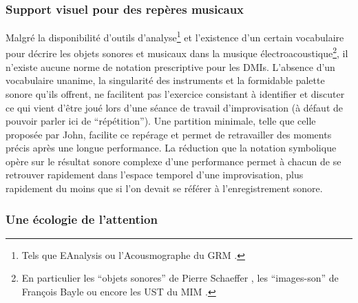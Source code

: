 \subsubsection{Support visuel pour des repères musicaux}

\noindent Malgré la disponibilité d'outils d'analyse\footnote{Tels que EAnalysis \cite{couprie_eanalysis:_2016} ou l'Acousmographe du \gls{GRM} \cite{favreau_lacousmographe_2010}.} et l'existence d'un certain vocabulaire pour décrire les objets sonores et musicaux dans la musique électroacoustique\footnote{En particulier les ``objets sonores'' de Pierre Schaeffer \cite{schaeffer_traite_1966}, les ``images-son'' de François Bayle \cite{bayle_musique_1993} ou encore les \gls{UST} du \gls{MIM} \cite{delalande_les_1996}.}, il n'existe aucune norme de notation prescriptive pour les \glspl{DMI}. L'absence d'un vocabulaire unanime, la singularité des instruments et la formidable palette sonore qu'ils offrent, ne facilitent pas l'exercice consistant à identifier et discuter ce qui vient d'être joué lors d'une séance de travail d'improvisation (à défaut de pouvoir parler ici de ``répétition''). Une partition minimale, telle que celle proposée par John, facilite ce repérage et permet de retravailler des moments précis après une longue performance. La réduction que la notation symbolique opère sur le résultat sonore complexe d'une performance permet à chacun de se retrouver rapidement dans l'espace temporel d'une improvisation, plus rapidement du moins que si l'on devait se référer à l'enregistrement sonore.

\subsubsection{Une écologie de l'attention}

